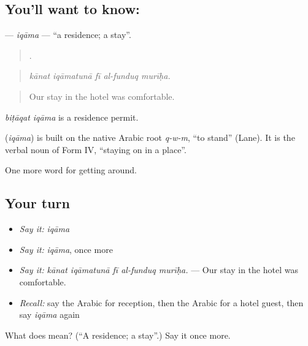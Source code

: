 \subsection*{You'll want to know: }
\textbf{} — \emph{iqāma} — \textquotedblleft{}a residence; a stay\textquotedblright{}.

\begin{quote}
    .
\end{quote}

\begin{quote}
\emph{kānat iqāmatunā fī al-funduq murīḥa.}
\end{quote}

\begin{quote}
Our stay in the hotel was comfortable.
\end{quote}

\emph{biṭāqat iqāma} is a residence permit.

\begin{cousinweb}
\textbf{} (\emph{iqāma}) is built on the native Arabic root \emph{q-w-m}, \textquotedblleft{}to stand\textquotedblright{} (Lane). It is the verbal noun of Form IV, \textquotedblleft{}staying on in a place\textquotedblright{}.
\end{cousinweb}

\begin{grammarlens}[title={What you've built}]
One more word for getting around.
\end{grammarlens}

\subsection*{Your turn}
\begin{itemize}
\raggedright
  \item \emph{Say it:} \emph{iqāma}
  \item \emph{Say it:} \emph{iqāma}, once more
  \item \emph{Say it:} \emph{kānat iqāmatunā fī al-funduq murīḥa.} — Our stay in the hotel was comfortable.
  \item \emph{Recall:} say the Arabic for reception, then the Arabic for a hotel guest, then say \emph{iqāma} again
\end{itemize}

\begin{tcolorbox}[breakable,colback=teal!4,colframe=teal!35!black,title={Before you move on}]
What does  mean? (\textquotedblleft{}A residence; a stay\textquotedblright{}.) Say it once more.
\end{tcolorbox}
